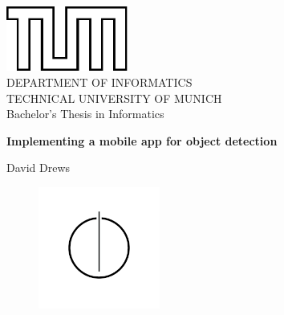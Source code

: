 \documentclass[
			   fontsize=11pt,
               paper=a4,
               bibliography=totoc,
               idxtotoc,
               headsepline,
               footsepline,
               footinclude=false,
               BCOR=12mm,
               DIV=13,
               openany,   %
               ]
               {scrbook}
\def\doctype{Bachelor's Thesis\xspace}
\def\studyProgram{Informatics}
\def\title{Implementing a mobile app for object detection}
\def\author{David Drews}
\begin{document}
\frontmatter

\def\bcorcor{0.15cm}
\addtolength{\hoffset}{\bcorcor}
\thispagestyle{empty}
\vspace{4cm}
\begin{center}
    \includegraphics[width=4cm]{templateStuff/tumlogo.pdf}\\[5mm]
    \huge DEPARTMENT OF INFORMATICS\\[5mm]
    \large TECHNICAL UNIVERSITY OF MUNICH\\[24mm]

    {\Large \doctype in \studyProgram}\\[20mm]
    {\huge\bf \title\par}
    \vspace{15mm}
    {\LARGE  \author}
    \vspace{10mm}
    \begin{figure}[h!]
        \centering
        \includegraphics[width=4cm]{templateStuff/informat.pdf}
   \end{figure}
\end{center}

\cleardoubleemptypage

\end{document}
